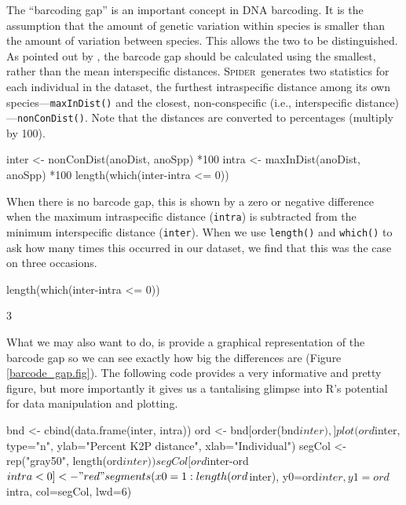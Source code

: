 \documentclass{article}
\newcommand{\Spider}{\textsc{Spider}} %
\newcommand{\fun}[1]{\texttt{#1}}
\begin{document}
The ``barcoding gap'' \citep{Meye.Paul.2005} is an important concept in DNA barcoding. It is the assumption that the amount of genetic variation within species is smaller than the amount of variation between species. This allows the two to be distinguished. As pointed out by \citet{Meier2008}, the barcode gap should be calculated using the smallest, rather than the mean interspecific distances. \Spider~generates two statistics for each individual in the dataset, the furthest intraspecific distance among its own species---\fun{maxInDist()} and the closest, non-conspecific (i.e., interspecific distance)---\fun{nonConDist()}. Note that the distances are converted to percentages (multiply by 100).

\begin{console}
inter <- nonConDist(anoDist, anoSpp) *100
intra <- maxInDist(anoDist, anoSpp) *100
length(which(inter-intra <= 0))
\end{console}

When there is no barcode gap, this is shown by a zero or negative difference when the maximum intraspecific distance (\fun{intra}) is subtracted from the minimum interspecific distance (\fun{inter}). When we use \fun{length()} and \fun{which()} to ask how many times this occurred in our dataset, we find that this was the case on three occasions.

\begin{console}
length(which(inter-intra <= 0))
\end{console}

\begin{Routput}
[1] 3
\end{Routput}

What we may also want to do, is provide a graphical representation of the barcode gap so we can see exactly how big the differences are (Figure \ref{barcode_gap.fig}). The following code provides a very informative and pretty figure, but more importantly it gives us a tantalising glimpse into R's potential for data manipulation and plotting. 

\begin{console}
bnd <- cbind(data.frame(inter, intra))
ord <- bnd[order(bnd$inter),]
plot(ord$inter, type="n", ylab="Percent K2P distance", xlab="Individual")
segCol <- rep("gray50", length(ord$inter))
segCol[ord$inter-ord$intra < 0] <- "red"
segments(x0=1:length(ord$inter), y0=ord$inter, y1=ord$intra, col=segCol, lwd=6)
\end{console}
\end{document}
